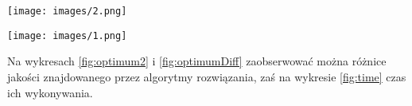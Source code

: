 \begin{figure*}
    \begin{center}
        \texttt{[image: images/2.png]}
    \end{center}
    \caption{Różnica (BinPack - AMPL) w ilości wykorzystanych prętów}
    \label{fig:optimumDiff}
\end{figure*}

\FloatBarrier %

\begin{figure*}
    \begin{center}
        \texttt{[image: images/1.png]}
    \end{center}
    \caption{Porównanie czasu wykonywania BinPack i AMPL}
    \label{fig:time}
\end{figure*}

\FloatBarrier %

Na wykresach \ref{fig:optimum2} i \ref{fig:optimumDiff} zaobserwować można różnice jakości znajdowanego przez algorytmy rozwiązania, zaś na wykresie \ref{fig:time} czas ich wykonywania.